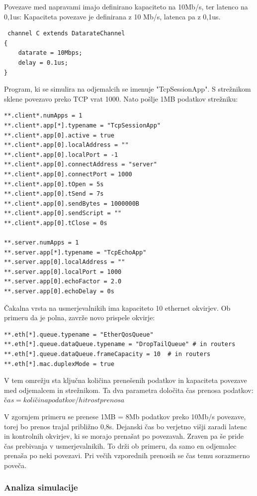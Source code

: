 \documentclass[11pt,a4paper,slovene]{myarticle}
\begin{document}
Povezave med napravami imajo definirano kapaciteto na 10Mb/s, ter latenco na 0,1us:
Kapaciteta povezave je definirana z 10 Mb/s, latenca pa z 0,1us.
\begin{lstlisting}
 channel C extends DatarateChannel
{
    datarate = 10Mbps;
    delay = 0.1us;
}
\end{lstlisting}

Program, ki se simulira na odjemalcih se imenuje "TcpSessionApp". S strežnikom sklene povezavo preko TCP vrat 1000. Nato pošlje 1MB podatkov strežniku:

\begin{lstlisting}
**.client*.numApps = 1
**.client*.app[*].typename = "TcpSessionApp"
**.client*.app[0].active = true
**.client*.app[0].localAddress = ""
**.client*.app[0].localPort = -1
**.client*.app[0].connectAddress = "server"
**.client*.app[0].connectPort = 1000
**.client*.app[0].tOpen = 5s
**.client*.app[0].tSend = 7s
**.client*.app[0].sendBytes = 1000000B
**.client*.app[0].sendScript = ""
**.client*.app[0].tClose = 0s

**.server.numApps = 1
**.server.app[*].typename = "TcpEchoApp"
**.server.app[0].localAddress = ""
**.server.app[0].localPort = 1000
**.server.app[0].echoFactor = 2.0
**.server.app[0].echoDelay = 0s
\end{lstlisting}

Čakalna vrsta na usmerjevalnikih ima kapaciteto 10 ethernet okvirjev. Ob primeru da je polna, zavrže novo prispele okvirje:

\begin{lstlisting}
**.eth[*].queue.typename = "EtherQosQueue"
**.eth[*].queue.dataQueue.typename = "DropTailQueue" # in routers
**.eth[*].queue.dataQueue.frameCapacity = 10  # in routers
**.eth[*].mac.duplexMode = true
\end{lstlisting}

V tem omrežju sta ključna količina prenešenih podatkov in kapaciteta povezave med odjemalcem in strežnikom. Ta dva parametra določita čas prenosa podatkov:
$čas = količina podatkov / hitrost prenosa$

V zgornjem primeru se prenese 1MB = 8Mb podatkov preko 10Mb/s povezave, torej bo prenos trajal približno 0,8s. Dejanski čas bo verjetno višji zaradi latenc in kontrolnih okvirjev, ki se morajo prenašat po povezavah.
Zraven pa še pride čas prebivanja v usmerjevalnikih.
To drži ob primeru, da samo en odjemalec prenaša po neki povezavi. Pri večih vzporednih prenosih se čas temu sorazmerno poveča.

\subsubsection{Analiza simulacije}
\end{document}
